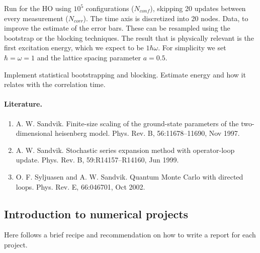 \documentclass[%
oneside,                 %
final,                   %
10pt]{article}
\begin{document}
\noindent
Run for the HO using $10^5$ configurations ($N_{conf}$), skipping 20 updates between every measurement ($N_{corr}$). The time axis is discretized into 20 nodes. Data, to improve the estimate of the error bars. These can be  resampled using the bootstrap or the blocking techniques. 
The result that is physically relevant is the first excitation energy, which we expect to be $1\hbar\omega$. For simplicity we set $\hbar=\omega=1$ and the lattice spacing parameter $a = 0.5$.

Implement statistical bootstrapping and blocking. 
Estimate energy and how it relates  with the correlation time.

\paragraph{Literature.}
\begin{enumerate}
\item A. W. Sandvik. Finite-size scaling of the ground-state parameters of the two-dimensional heisenberg model. Phys. Rev. B, 56:11678–11690, Nov 1997.

\item A. W. Sandvik. Stochastic series expansion method with operator-loop update. Phys. Rev. B, 59:R14157–R14160, Jun 1999.

\item O. F. Syljuasen and A. W. Sandvik. Quantum Monte Carlo with directed loops. Phys. Rev. E, 66:046701, Oct 2002.~
\end{enumerate}

\noindent
\subsection*{Introduction to numerical projects}

Here follows a brief recipe and recommendation on how to write a report for each
project.
\end{document}
